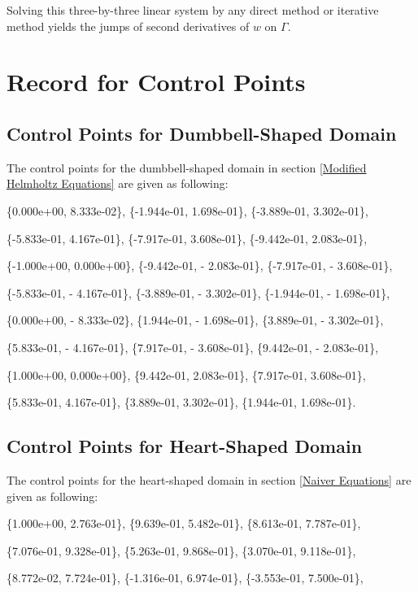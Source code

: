 \documentclass{article}
\begin{document}
Solving this three-by-three linear system by any direct method or iterative method yields the jumps of second derivatives of $w$ on $\Gamma$.
\fi
\section{Record for Control Points} \label{Record for Control Points}

\subsection{Control Points for Dumbbell-Shaped Domain} \label{appen:Control Points for Dumbbel-Shaped Domain}
The control points for the dumbbell-shaped domain in section \ref{Modified Helmholtz Equations} are given as following:

\{0.000e+00, 8.333e-02\}, 
\{-1.944e-01, 1.698e-01\}, 
\{-3.889e-01, 3.302e-01\}, 

\{-5.833e-01, 4.167e-01\}, 
\{-7.917e-01, 3.608e-01\},
\{-9.442e-01, 2.083e-01\}, 
  
\{-1.000e+00, 0.000e+00\},
\{-9.442e-01, - 2.083e-01\},
\{-7.917e-01, - 3.608e-01\},
  
\{-5.833e-01, - 4.167e-01\},
\{-3.889e-01, - 3.302e-01\}, 
\{-1.944e-01, - 1.698e-01\}, 
  
\{0.000e+00, - 8.333e-02\},
\{1.944e-01, - 1.698e-01\},
\{3.889e-01, - 3.302e-01\},
  
\{5.833e-01, - 4.167e-01\}, 
\{7.917e-01, - 3.608e-01\}, 
\{9.442e-01, - 2.083e-01\},
  
\{1.000e+00, 0.000e+00\}, 
\{9.442e-01, 2.083e-01\},
\{7.917e-01, 3.608e-01\}, 

\{5.833e-01, 4.167e-01\},
\{3.889e-01, 3.302e-01\},
\{1.944e-01, 1.698e-01\}.

\subsection{Control Points for Heart-Shaped Domain} \label{appen:Control Points for Heart-Shaped Domain}
The control points for the heart-shaped domain in section \ref{Naiver Equations} are given as following:

\{1.000e+00, 2.763e-01\},
\{9.639e-01, 5.482e-01\},
\{8.613e-01, 7.787e-01\},

\{7.076e-01, 9.328e-01\},
\{5.263e-01, 9.868e-01\}, 
\{3.070e-01, 9.118e-01\},

\{8.772e-02, 7.724e-01\},
\{-1.316e-01, 6.974e-01\},
\{-3.553e-01, 7.500e-01\},
\end{document}
